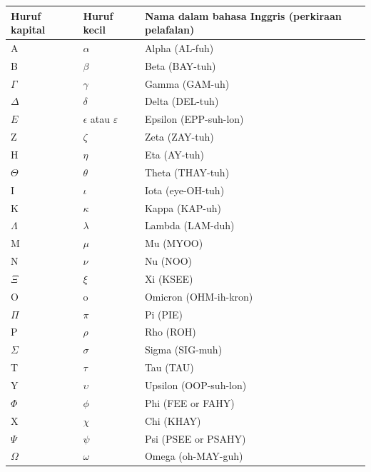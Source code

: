 \begin{center}
{\renewcommand{\arraystretch}{1.10}%
\begin{tabularx}{\textwidth}{@{}>{\centering\arraybackslash}p{}>{\centering\arraybackslash}p{}>{\raggedright\arraybackslash}X@{}}
\hline
\textbf{Huruf kapital} & \textbf{Huruf kecil} & \textbf{Nama dalam bahasa Inggris (perkiraan pelafalan)} \\
\hline
A         & $\alpha$                    & Alpha (AL-fuh) \\
B         & $\beta$                     & Beta (BAY-tuh) \\
$\Gamma$  & $\gamma$                    & Gamma (GAM-uh) \\
$\Delta$  & $\delta$                    & Delta (DEL-tuh) \\
$E$       & $\epsilon$ atau $\varepsilon$ & Epsilon (EPP-suh-lon) \\
Z         & $\zeta$                     & Zeta (ZAY-tuh) \\
H         & $\eta$                      & Eta (AY-tuh) \\
$\Theta$  & $\theta$                    & Theta (THAY-tuh) \\
I         & $\iota$                     & Iota (eye-OH-tuh) \\
K         & $\kappa$                    & Kappa (KAP-uh) \\
$\Lambda$ & $\lambda$                   & Lambda (LAM-duh) \\
M         & $\mu$                       & Mu (MYOO) \\
N         & $\nu$                       & Nu (NOO) \\
$\Xi$     & $\xi$                       & Xi (KSEE) \\
O         & o                            & Omicron (OHM-ih-kron) \\
$\Pi$     & $\pi$                       & Pi (PIE) \\
P         & $\rho$                      & Rho (ROH) \\
$\Sigma$  & $\sigma$                    & Sigma (SIG-muh) \\
T         & $\tau$                      & Tau (TAU) \\
Y         & $\upsilon$                  & Upsilon (OOP-suh-lon) \\
$\Phi$    & $\phi$                      & Phi (FEE or FAHY) \\
X         & $\chi$                      & Chi (KHAY) \\
$\Psi$    & $\psi$                      & Psi (PSEE or PSAHY) \\
$\Omega$  & $\omega$                    & Omega (oh-MAY-guh) \\
\hline
\end{tabularx}}
\end{center}








